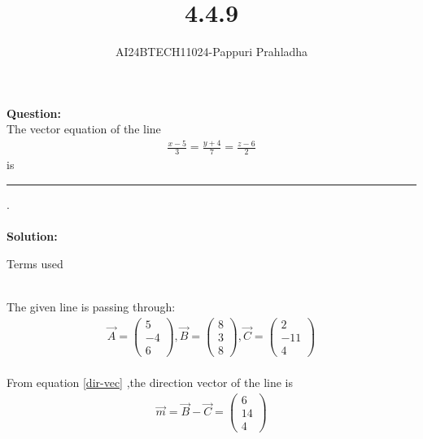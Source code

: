 \documentclass[journal]{IEEEtran}
\begin{document}

\vspace{3cm}

\title{4.4.9}
\author{AI24BTECH11024-Pappuri Prahladha}
{\let\newpage\relax\maketitle}

\renewcommand{\thefigure}{\theenumi}
\renewcommand{\thetable}{\theenumi}
\setlength{\intextsep}{10pt} %


\renewcommand{\thetable}{\theenumi}


\textbf{Question:}\\
The vector equation of the line 
\begin{align*}
	\frac{x-5}{3}=\frac{y+4}{7}=\frac{z-6}{2} 
\end{align*}
is \noindent\rule{1cm}{0.1pt}.\\
\\
\textbf{Solution: }\\
\begin{table}[h!]
    \renewcommand{\thetable}{1}
    \centering
    
    \caption{Terms used}
    \label{TABLE 1:}
\end{table}\\
The given line is passing through: \\
\begin{align*}
\vec{A}=\begin{pmatrix}
5\\
-4\\
6
\end{pmatrix},
\vec{B}=\begin{pmatrix}
8\\
3\\
8
\end{pmatrix},
\vec{C}=\begin{pmatrix}
2\\
-11\\
4
\end{pmatrix}   
\end{align*}\\
 From equation \eqref{dir-vec} ,the direction vector of the line is\\
\begin{align}
\vec{m}=\vec{B}-\vec{C}=\begin{pmatrix}
6\\
14\\
4
\end{pmatrix}  
\end{align}\\
\end{document}

